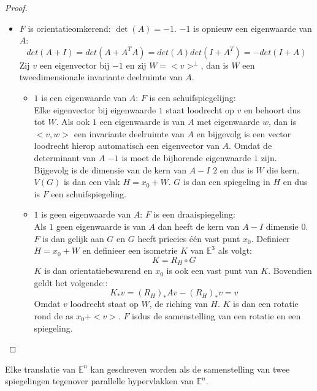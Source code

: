 \documentclass[main.tex]{subfiles}
\begin{document}
\begin{st}
\begin{proof}
\begin{itemize}
    \item $F$ is orientatieomkerend: $\det(A) = -1$.
      $-1$ is opnieuw een eigenwaarde van $A$:
      \[ det(A+I) = det(A+A^{T}A) = det(A)det(I+A^{T}) = -det(I+A) \]
      Zij $v$ een eigenvector bij $-1$ en zij $W=<v>^{\bot}$, dan is $W$ een tweedimensionale invariante deelruimte van $A$.
      \begin{itemize}
      \item $1$ is een eigenwaarde van $A$: $F$ is een schuifspiegelijng:\\
        Elke eigenvector bij eigenwaarde $1$ staat loodrecht op $v$ en behoort dus tot $W$.
        Als ook $1$ een eigenwaarde is van $A$ met eigenwaarde $w$, dan is $<v,w>$ een invariante deelruimte van $A$ en bijgevolg is een vector loodrecht hierop automatisch een eigenvector van $A$.
        Omdat de determinant van $A$ $-1$ is moet de bijhorende eigenwaarde $1$ zijn.
        Bijgevolg is de dimensie van de kern van $A-I$ $2$ en dus is $W$ die kern.
        $V(G)$ is dan een vlak $H=x_{0}+W$.
        $G$ is dan een spiegeling in $H$ en dus is $F$ een schuifspiegeling.
      \item $1$ is geen eigenwaarde van $A$: $F$ is een draaispiegeling:\\
        Als $1$ geen eigenwaarde is van $A$ dan heeft de kern van $A-I$ dimensie $0$.
        $F$ is dan gelijk aan $G$ en $G$ heeft priecies \'e\'en vast punt $x_{0}$.
        Definieer $H=x_{0}+W$ en definieer een isometrie $K$ van $\mathbb{E}^{3}$ als volgt:
        \[ K = R_{H} \circ G \]
        $K$ is dan orientatiebewarend \needed en $x_{0}$ is ook een vast punt van $K$.
        Bovendien geldt het volgende::
        \[ K_{*}v = (R_{H})_{*}Av  -(R_{H})_{*}v = v \]
        Omdat $v$ loodrecht staat op $W$, de riching van $H$.
        $K$ is dan een rotatie rond de as $x_{0}+<v>$.
        $F$ isdus de samenstelling van een rotatie en een spiegeling.
      \end{itemize}
    \end{itemize}
  \end{proof}
\end{st}


\begin{st}
  \examen
  Elke translatie van $\mathbb{E}^{n}$ kan geschreven worden als de samenstelling van twee spiegelingen tegenover parallelle hypervlakken van $\mathbb{E}^{n}$.
\end{st}
\end{document}

